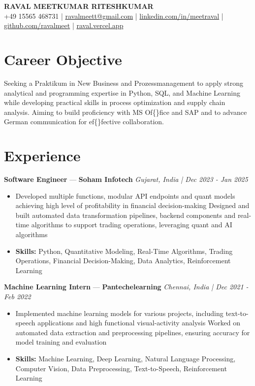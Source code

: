 \documentclass[a4paper,10pt]{article}
\begin{document}
\begin{center}
  {\Large\bfseries RAVAL MEETKUMAR RITESHKUMAR}\\[2pt]
  {\small +49 15565 468731 \;|\; \href{mailto:ravalmeett@gmail.com}{ravalmeett@gmail.com} \;|\; \href{https://www.linkedin.com/in/meetraval/}{linkedin.com/in/meetraval} \;|\; \href{https://github.com/ravalmeet}{github.com/ravalmeet} \;|\; \href{https://raval.vercel.app/}{raval.vercel.app}}
\end{center}
\vspace{-3pt}

\section*{Career Objective}
Seeking a Praktikum in New Business and Prozessmanagement to apply strong analytical and programming expertise in Python, SQL, and Machine Learning while developing practical skills in process optimization and supply chain analysis. Aiming to build proficiency with MS Of\{\}fice and SAP and to advance German communication for ef\{\}fective collaboration.\par

\section*{Experience}
\textbf{Software Engineer} — \textbf{Soham Infotech} \hfill \textit{Gujarat, India \;|\; Dec 2023 - Jan 2025}\par
\vspace{1pt}
\begin{itemize}
  \item Developed multiple functions, modular API endpoints and quant models achieving high level of profitability in financial decision-making Designed and built automated data transformation pipelines, backend components and real-time algorithms to support trading operations, leveraging quant and AI algorithms
  \item \textbf{Skills:} Python, Quantitative Modeling, Real-Time Algorithms, Trading Operations, Financial Decision-Making, Data Analytics, Reinforcement Learning
\end{itemize}
\vspace{3pt}
\textbf{Machine Learning Intern} — \textbf{Pantechelearning} \hfill \textit{Chennai, India \;|\; Dec 2021 - Feb 2022}\par
\vspace{1pt}
\begin{itemize}
  \item Implemented machine learning models for various projects, including text-to-speech applications and high functional visual-activity analysis Worked on automated data extraction and preprocessing pipelines, ensuring accuracy for model training and evaluation
  \item \textbf{Skills:} Machine Learning, Deep Learning, Natural Language Processing, Computer Vision, Data Preprocessing, Text-to-Speech, Reinforcement Learning
\end{itemize}
\end{document}
